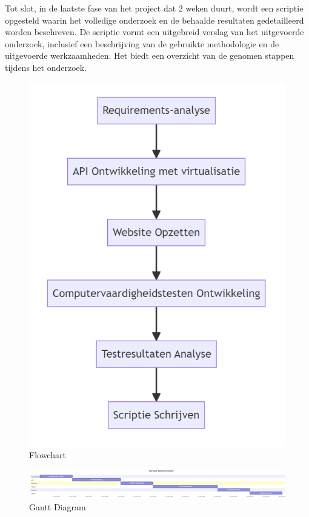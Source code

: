 Tot slot, in de laatste fase van het project dat 2 weken duurt, wordt een scriptie opgesteld waarin het volledige onderzoek en de behaalde resultaten gedetailleerd worden beschreven. De scriptie vormt een uitgebreid verslag van het uitgevoerde onderzoek, inclusief een beschrijving van de gebruikte methodologie en de uitgevoerde werkzaamheden. Het biedt een overzicht van de genomen stappen tijdens het onderzoek.


\begin{figure}[ht]
  \centering
  \includegraphics[width=\linewidth]{./graphics/flowchart.png}
  \caption{Flowchart}
  \label{fig:flowchart}
\end{figure}

\begin{figure}[ht]
  \centering
  \includegraphics[width=\linewidth]{./graphics/gantt.png}
  \caption{Gantt Diagram}
  \label{fig:gantt}
\end{figure}

